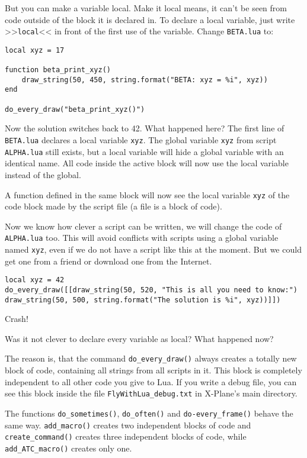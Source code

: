 \documentclass[11pt,parskip=half,a4paper]{scrartcl}
\begin{document}
But you can make a variable local. Make it local means, it can't be seen from code outside of the block it is declared in. To declare a local variable, just write >>\verb|local|<< in front of the first use of the variable. Change \verb|BETA.lua| to:

\begin{lstlisting}
local xyz = 17

function beta_print_xyz()
    draw_string(50, 450, string.format("BETA: xyz = %i", xyz))
end

do_every_draw("beta_print_xyz()")
\end{lstlisting}

Now the solution switches back to 42. What happened here? The first line of \verb|BETA.lua| declares a local variable \verb|xyz|. The global variable \verb|xyz| from script \verb|ALPHA.lua| still exists, but a local variable will hide a global variable with an identical name. All code inside the active block will now use the local variable instead of the global.

A function defined in the same block will now see the local variable \verb|xyz| of the code block made by the script file (a file is a block of code).

Now we know how clever a script can be written, we will change the code of \verb|ALPHA.lua| too. This will avoid conflicts with scripts using a global variable named \verb|xyz|, even if we do not have a script like this at the moment. But we could get one from a friend or download one from the Internet.

\begin{lstlisting}
local xyz = 42
do_every_draw([[draw_string(50, 520, "This is all you need to know:")
draw_string(50, 500, string.format("The solution is %i", xyz))]])
\end{lstlisting}

Crash!

Was it not clever to declare every variable as local? What happened now?

The reason is, that the command \verb|do_every_draw()| always creates a totally new block of code, containing all strings from all scripts in it. This block is completely independent to all other code you give to Lua. If you write a debug file, you can see this block inside the file \verb|FlyWithLua_debug.txt| in X-Plane's main directory.

The functions \verb|do_sometimes()|, \verb|do_often()| and \verb|do-every_frame()| behave the same way. \verb|add_macro()| creates two independent blocks of code and \verb|create_command()| creates three independent blocks of code, while \verb|add_ATC_macro()| creates only one.
\end{document}
